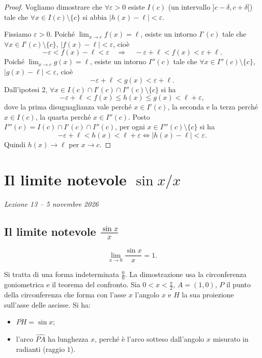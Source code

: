 \documentclass[11pt,a4paper]{article}
\begin{document}
\begin{proof}
Vogliamo dimostrare che $\forall\varepsilon > 0$ esiste $I(c)$ (un intervallo $]c - \delta, c + \delta[$) tale che $\forall x \in I(c)\setminus\{c\}$ si abbia $|h(x) - \ell| < \varepsilon$.

Fissiamo $\varepsilon > 0$. Poiché $\displaystyle\lim_{x\to c} f(x) = \ell$, esiste un intorno $I'(c)$ tale che $\forall x \in I'(c)\setminus\{c\}$, $|f(x) - \ell| < \varepsilon$, cioè
\[
  -\varepsilon < f(x) - \ell < \varepsilon \quad\Longrightarrow\quad -\varepsilon + \ell < f(x) < \varepsilon + \ell .
\]
Poiché $\displaystyle\lim_{x\to c} g(x) = \ell$, esiste un intorno $I''(c)$ tale che $\forall x \in I''(c)\setminus\{c\}$, $|g(x) - \ell| < \varepsilon$, cioè
\[
  -\varepsilon + \ell < g(x) < \varepsilon + \ell .
\]
Dall'ipotesi 2, $\forall x \in I(c)\cap I'(c)\cap I''(c)\setminus\{c\}$ si ha
\[
  -\varepsilon + \ell < f(x) \le h(x) \le g(x) < \ell + \varepsilon ,
\]
dove la prima disuguaglianza vale perché $x \in I'(c)$, la seconda e la terza perché $x \in I(c)$, la quarta perché $x \in I''(c)$. Posto $I'''(c) = I(c)\cap I'(c)\cap I''(c)$, per ogni $x \in I'''(c)\setminus\{c\}$ si ha
\[
  -\varepsilon + \ell < h(x) < \ell + \varepsilon \iff |h(x) - \ell| < \varepsilon .
\]
Quindi $h(x) \to \ell$ per $x \to c$.
\end{proof}

\section[Il limite notevole $\sin x / x$ (Lezione 13 -- 5 novembre 2026)]{Il limite notevole $\sin x / x$}
\noindent\emph{Lezione 13 -- 5 novembre 2026}
\subsection{Il limite notevole $\frac{\sin x}{x}$}

\begin{teorema}
\[
  \lim_{x\to 0}\frac{\sin x}{x} = 1 .
\]
\end{teorema}

Si tratta di una forma indeterminata $\frac{0}{0}$. La dimostrazione usa la circonferenza goniometrica e il teorema del confronto. Sia $0 < x < \frac{\pi}{2}$, $A = (1, 0)$, $P$ il punto della circonferenza che forma con l'asse $x$ l'angolo $x$ e $H$ la sua proiezione sull'asse delle ascisse. Si ha:
\begin{itemize}
  \item $\overline{PH} = \sin x$;
  \item l'arco $\widehat{PA}$ ha lunghezza $x$, perché è l'arco sotteso dall'angolo $x$ misurato in radianti (raggio $1$).
\end{itemize}
\end{document}
